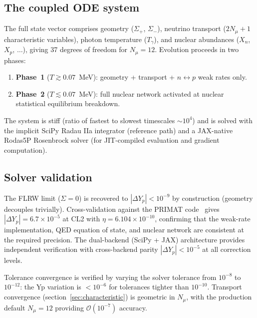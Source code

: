 \documentclass[a4paper,11pt]{article}
\newcommand{\Sig}{\Sigma}
\newcommand{\Yp}{Y_p}
\newcommand{\order}{\mathcal{O}}
\begin{document}
\subsection{The coupled ODE system}\label{sec:coupled}

The full state vector comprises geometry ($\Sig_+$, $\Sig_-$), neutrino transport ($2N_\mu + 1$ characteristic variables), photon temperature ($T_\gamma$), and nuclear abundances ($X_n$, $X_p$, $\ldots$), giving 37 degrees of freedom for $N_\mu = 12$.  Evolution proceeds in two phases:
\begin{enumerate}
\item \textbf{Phase~1} ($T \gtrsim 0.07$~MeV): geometry + transport + $n\leftrightarrow p$ weak rates only.
\item \textbf{Phase~2} ($T \lesssim 0.07$~MeV): full nuclear network activated at nuclear statistical equilibrium breakdown.
\end{enumerate}
The system is stiff (ratio of fastest to slowest timescales $\sim 10^4$) and is solved with the implicit SciPy Radau IIa integrator (reference path) and a JAX-native Rodas5P Rosenbrock solver (for JIT-compiled evaluation and gradient computation).

\subsection{Solver validation}

The FLRW limit ($\Sig = 0$) is recovered to $|\Delta\Yp| < 10^{-9}$ by construction (geometry decouples trivially).  Cross-validation against the PRIMAT code~\cite{PitrouPRIMAT2021} gives $|\Delta\Yp| = 6.7\times 10^{-5}$ at CL2 with $\eta = 6.104\times 10^{-10}$, confirming that the weak-rate implementation, QED equation of state, and nuclear network are consistent at the required precision.  The dual-backend (SciPy + JAX) architecture provides independent verification with cross-backend parity $|\Delta\Yp| < 10^{-5}$ at all correction levels.

Tolerance convergence is verified by varying the solver tolerance from $10^{-8}$ to $10^{-12}$: the Yp variation is $< 10^{-6}$ for tolerances tighter than $10^{-10}$.  Transport convergence (section~\ref{sec:characteristic}) is geometric in $N_\mu$, with the production default $N_\mu = 12$ providing $\order(10^{-7})$ accuracy.


\end{document}
